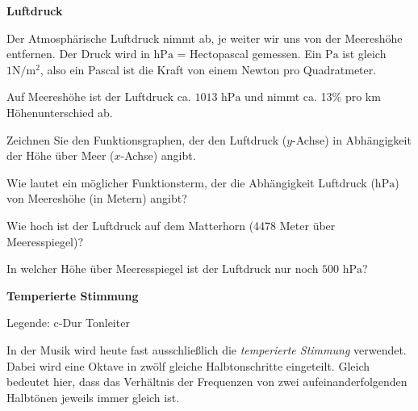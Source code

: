 \bbwActAufgabenNr{} \textbf{Luftdruck}

Der Atmosphärische Luftdruck nimmt ab, je weiter wir uns von der
Meereshöhe entfernen. Der Druck wird in $\textrm{hPa}$ = Hectopascal
gemessen. Ein $\textrm{Pa}$ ist gleich $1 \textrm{N}/\textrm{m}^2$, also ein
Pascal ist die Kraft von einem Newton pro Quadratmeter.

Auf Meereshöhe ist der Luftdruck ca. $ 1013 \textrm{ hPa}$ und nimmt
ca. 13\% pro km Höhenunterschied ab.

\begin{bbwAufgabenBlock}

\item Zeichnen Sie den Funktionsgraphen, der den Luftdruck ($y$-Achse)
  in Abhängigkeit der Höhe über Meer ($x$-Achse) angibt.


\item Wie lautet ein möglicher Funktionsterm, der die Abhängigkeit
  Luftdruck ($\textrm{hPa}$) von Meereshöhe (in Metern) angibt?



\item Wie hoch ist der Luftdruck auf dem Matterhorn (4478 Meter über
  Meeresspiegel)?


\item In welcher Höhe über Meeresspiegel ist der Luftdruck nur noch
  $500 \textrm{ hPa}$?

  
\end{bbwAufgabenBlock}
\platzFuerBerechnungenBisEndeSeite{}



\bbwActAufgabenNr{} \textbf{Temperierte Stimmung}

\begin{center}Legende: c-Dur Tonleiter\end{center}


In der Musik wird heute fast ausschließlich die \textit{temperierte
  Stimmung} verwendet. Dabei wird eine Oktave in zwölf gleiche
Halbtonschritte eingeteilt. Gleich bedeutet hier, dass das Verhältnis
der Frequenzen von zwei aufeinanderfolgenden Halbtönen jeweils immer
gleich ist.

